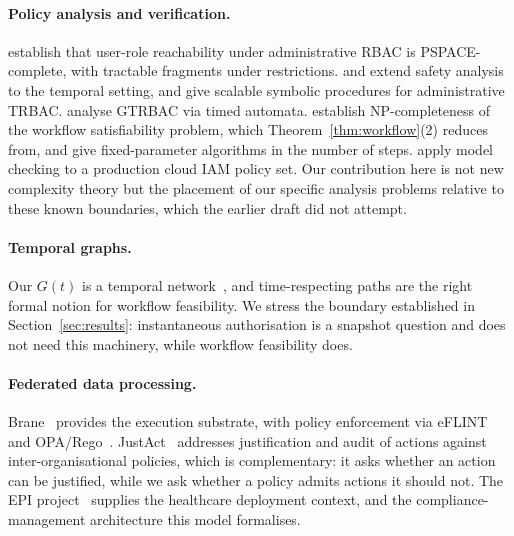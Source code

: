 \documentclass[11pt]{article}
\theoremstyle{definition}
\theoremstyle{plain}
\theoremstyle{remark}
\begin{document}
\paragraph{Policy analysis and verification.} \citet{sasturkar2011arbac}
establish that user-role reachability under administrative RBAC is
PSPACE-complete, with tractable fragments under restrictions.
\citet{uzun2012trbacanalysis} and \citet{jha2014trbacadmin} extend safety
analysis to the temporal setting, and \citet{ranise2014atrbac} give scalable
symbolic procedures for administrative TRBAC.
\citet{mondal2009timedautomata} analyse GTRBAC via timed automata.
\citet{wang2010wsp} establish NP-completeness of the workflow satisfiability
problem, which Theorem~\ref{thm:workflow}(2) reduces from, and
\citet{crampton2013wspseniority} give fixed-parameter algorithms in the number
of steps. \citet{gouglidis2023modelchecking} apply model checking to a
production cloud IAM policy set. Our contribution here is not new complexity
theory but the placement of our specific analysis problems relative to these
known boundaries, which the earlier draft did not attempt.

\paragraph{Temporal graphs.} Our $G(t)$ is a temporal
network~\citep{holme2012temporal}, and time-respecting paths are the right
formal notion for workflow feasibility. We stress the boundary established in
Section~\ref{sec:results}: instantaneous authorisation is a snapshot question
and does not need this machinery, while workflow feasibility does.

\paragraph{Federated data processing.} Brane~\citep{valkering2021brane} provides
the execution substrate, with policy enforcement via
eFLINT~\citep{binsbergen2020eflint} and OPA/Rego~\citep{opa,kokash2024reasoner}.
JustAct~\citep{esterhuyse2024justact} addresses justification and audit of
actions against inter-organisational policies, which is complementary: it asks
whether an action can be justified, while we ask whether a policy admits actions
it should not. The EPI project~\citep{kassem2024epi} supplies the healthcare
deployment context, and \citet{kokash2026compliance} the compliance-management
architecture this model formalises.

\end{document}
